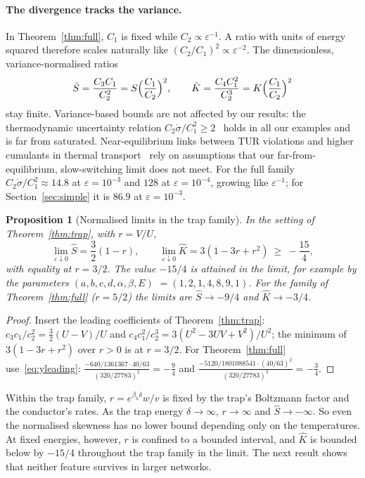 \documentclass[11pt,a4paper]{article}
\newtheorem{proposition}[theorem]{Proposition}
\theoremstyle{remark}\newtheorem{remark}[theorem]{Remark}
\newcommand{\eps}{\varepsilon}
\begin{document}
\paragraph{The divergence tracks the variance.} In Theorem~\ref{thm:full}, $C_1$ is fixed while $C_2\propto\eps^{-1}$. A ratio with units of energy squared therefore scales naturally like $(C_2/C_1)^2\propto\eps^{-2}$. The dimensionless, variance-normalised ratios
\begin{equation}
\hat S=\frac{C_3C_1}{C_2^2}=S\Bigl(\frac{C_1}{C_2}\Bigr)^2,\qquad \hat K=\frac{C_4C_1^2}{C_2^3}=K\Bigl(\frac{C_1}{C_2}\Bigr)^2
\end{equation}
stay finite. Variance-based bounds are not affected by our results: the thermodynamic uncertainty relation $C_2\dot\sigma/C_1^2\ge2$~\cite{BaratoSeifert2015,Gingrich2016} holds in all our examples and is far from saturated. Near-equilibrium links between TUR violations and higher cumulants in thermal transport~\cite{Saryal2019} rely on assumptions that our far-from-equilibrium, slow-switching limit does not meet. For the full family $C_2\dot\sigma/C_1^2\approx14.8$ at $\eps=10^{-3}$ and $128$ at $\eps=10^{-4}$, growing like $\eps^{-1}$; for Section~\ref{sec:simple} it is $86.9$ at $\eps=10^{-3}$.

\begin{proposition}[Normalised limits in the trap family]\label{prop:normlim}
In the setting of Theorem~\ref{thm:trap}, with $r=V/U$,
\begin{equation}
\lim_{\eps\downarrow0}\hat S=\frac32(1-r),\qquad\lim_{\eps\downarrow0}\hat K=3(1-3r+r^2)\ \ge\ -\frac{15}{4},
\end{equation}
with equality at $r=3/2$. The value $-15/4$ is attained in the limit, for example by the parameters $(a,b,c,d,\alpha,\beta,E)$ $=(1,2,1,4,8,9,1)$. For the family of Theorem~\ref{thm:full} ($r=5/2$) the limits are $\hat S\to-9/4$ and $\hat K\to-3/4$.
\end{proposition}
\begin{proof}
Insert the leading coefficients of Theorem~\ref{thm:trap}: $c_3c_1/c_2^2=\frac32(U-V)/U$ and $c_4c_1^2/c_2^3=3(U^2-3UV+V^2)/U^2$; the minimum of $3(1-3r+r^2)$ over $r>0$ is at $r=3/2$. For Theorem~\ref{thm:full} use~\eqref{eq:yleading}: $\frac{-640/1361367\cdot40/63}{(320/27783)^2}=-\frac94$ and $\frac{-5120/1801088541\cdot(40/63)^2}{(320/27783)^3}=-\frac34$.
\end{proof}
Within the trap family, $r=e^{\beta_h\delta}w/v$ is fixed by the trap's Boltzmann factor and the conductor's rates. As the trap energy $\delta\to\infty$, $r\to\infty$ and $\hat S\to-\infty$. So even the normalised skewness has no lower bound depending only on the temperatures. At fixed energies, however, $r$ is confined to a bounded interval, and $\hat K$ is bounded below by $-15/4$ throughout the trap family in the limit. The next result shows that neither feature survives in larger networks.
\end{document}
